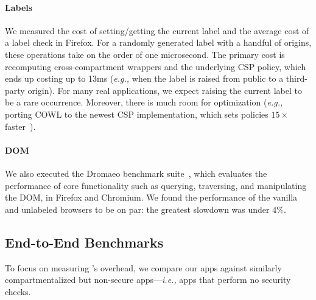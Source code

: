\paragraph{Labels} We measured the cost of setting/getting the current
label and the average cost of a label check in Firefox.
%
For a randomly generated label with a handful of origins, these
operations take on the order of one microsecond.
%
The primary cost is recomputing cross-compartment wrappers and
the underlying CSP policy, which ends up costing up to 13ms (\emph{e.g.,} when
the label is raised from public to a third-party origin).
%
For many real applications, we expect raising the current label
to be a rare occurrence.
%
Moreover, there is much room for optimization (\emph{e.g.,}
porting COWL to the newest CSP implementation, which sets
policies $15\times$ faster~\cite{faster-csp}).
 
\paragraph{DOM} We also executed the Dromaeo benchmark suite~\cite{dromaeo},
which evaluates the performance of core functionality such as
querying, traversing, and manipulating the DOM, in Firefox and
Chromium. We found the performance of the vanilla and unlabeled
browsers to be on par: the greatest slowdown was under 4\%.

\subsection{End-to-End Benchmarks}
\label{sec:eval:macro}

%
To focus on measuring \sys{}'s overhead, we compare our apps
against similarly compartmentalized but non-secure apps---\emph{i.e.,}
apps that perform no security checks.
%

